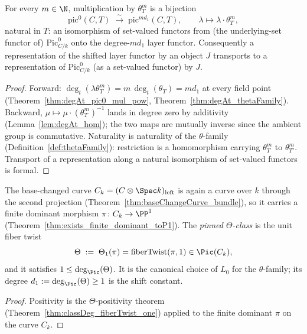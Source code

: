 \begin{theorem}
  \label{thm:mulThetaPowNatIso}
  \leanok
  For every \(m \in \N\), multiplication by \(\theta_T^{m}\) is a bijection
  \[
    \mathrm{pic}^0(C,T) \;\xrightarrow{\ \sim\ }\; \mathrm{pic}^{m d_1}(C,T),
    \qquad \lambda \mapsto \lambda \cdot \theta_T^{m},
  \]
  natural in \(T\): an isomorphism of set-valued functors from (the underlying-set functor
  of) \(\mathrm{Pic}^0_{C/k}\) onto the degree-\(m d_1\) layer functor. Consequently a
  representation of the shifted layer functor by an object \(J\) transports to a
  representation of \(\mathrm{Pic}^0_{C/k}\) (as a set-valued functor) by \(J\).
\end{theorem}
\begin{proof}
  \leanok
  Forward: \(\deg_t(\lambda\theta_T^m) = m\,\deg_t(\theta_T) = m d_1\) at every field point
  (Theorem~\ref{thm:degAt_pic0_mul_pow}, Theorem~\ref{thm:degAt_thetaFamily}). Backward,
  \(\mu \mapsto \mu \cdot (\theta_T^{m})^{-1}\) lands in degree zero by additivity
  (Lemma~\ref{lem:degAt_hom}); the two maps are mutually inverse since the ambient group is
  commutative. Naturality is naturality of the \(\theta\)-family
  (Definition~\ref{def:thetaFamily}): restriction is a homomorphism carrying
  \(\theta_T^{m}\) to \(\theta_{T'}^{m}\). Transport of a representation along a natural
  isomorphism of set-valued functors is formal.
\end{proof}

\begin{definition}
  \label{def:thetaCechClass}
  \leanok
  The base-changed curve \(C_k = (C \otimes \Spec k)_{\mathrm{left}}\) is again a curve over
  \(k\) through the second projection (Theorem~\ref{thm:baseChangeCurve_bundle}), so it
  carries a finite dominant morphism \(\pi \colon C_k \to \PP^1\)
  (Theorem~\ref{thm:exists_finite_dominant_toP1}). The \emph{pinned \(\Theta\)-class} is the
  unit fiber twist
  \[
    \Theta \;:=\; \Theta_1(\pi) = \mathrm{fiberTwist}(\pi, 1) \in \Pic(C_k),
  \]
  and it satisfies \(1 \le \deg_{\Pic}(\Theta)\). It is the canonical choice of \(L_0\) for
  the \(\theta\)-family; its degree \(d_1 := \deg_{\Pic}(\Theta) \ge 1\) is the shift
  constant.
\end{definition}
\begin{proof}
  \leanok
  Positivity is the \(\Theta\)-positivity theorem
  (Theorem~\ref{thm:classDeg_fiberTwist_one}) applied to the finite dominant \(\pi\) on the
  curve \(C_k\).
\end{proof}

